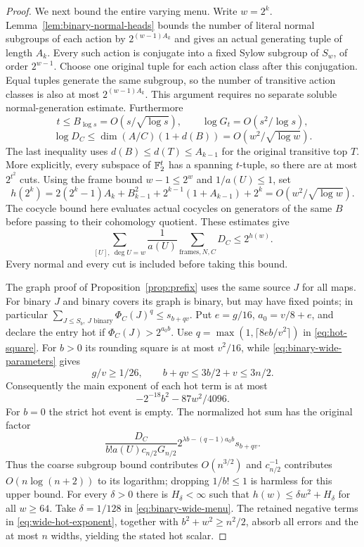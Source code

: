\begin{proof}
We next bound the entire varying menu. Write $w=2^k$.
Lemma~\ref{lem:binary-normal-heads} bounds the number of literal
normal subgroups of each action by $2^{(w-1)A_k}$ and gives an
actual generating tuple of length $A_k$. Every such action is
conjugate into a fixed Sylow subgroup of $S_w$, of order
$2^{w-1}$. Choose one original tuple for each action class after
this conjugation. Equal tuples generate the same subgroup, so
the number of transitive action classes is also at most
$2^{(w-1)A_k}$. This argument requires no separate soluble
normal-generation estimate.
Furthermore
\[
 t\leq B_{\log s}=O(s/\sqrt{\log s}),\qquad
 \log G_t=O(s^2/\log s),
\]
\[
 \log D_C\leq\dim(A/C)(1+d(B))=O(w^2/\sqrt{\log w}).
\]
The last inequality uses $d(B)\leq d(T)\leq A_{k-1}$ for the
original transitive top $T$. More explicitly, every subspace of
$\mathbb F_2^t$ has a spanning $t$-tuple, so there are at most $2^{t^2}$
cuts. Using the frame bound $w-1\leq2^w$ and $1/a(U)\leq1$, set
\[
 h(2^k)=2(2^k-1)A_k+B_{k-1}^2
          +2^{k-1}(1+A_{k-1})+2^k
       =O(w^2/\sqrt{\log w}).
\]
The cocycle bound here evaluates actual cocycles on generators
of the same $B$ before passing to their cohomology quotient.
These estimates give
\begin{equation}\label{eq:binary-wide-menu}
 \sum_{[U],\ \deg U=w}\frac1{a(U)}
        \sum_{\text{frames},N,C}D_C\leq2^{h(w)}.
\end{equation}
Every normal and every cut is included before taking this bound.

The graph proof of Proposition~\ref{prop:prefix} uses the same source
$J$ for all maps. For binary $J$ and binary covers its graph is binary,
but may have fixed points; in particular
$\sum_{J\leq S_b,\ J\text{ binary}}\Phi_C(J)^q\leq s_{b+qv}$.
Put $e=g/16$, $a_0=v/8+e$, and declare the entry hot if
$\Phi_C(J)>2^{a_0b}$. Use
$q=\max(1,\lceil8eb/v^2\rceil)$ in \eqref{eq:hot-square}.
For $b>0$ its rounding square is at most $v^2/16$, while
\eqref{eq:binary-wide-parameters} gives
\[
 g/v\geq1/26,\qquad b+qv\leq3b/2+v\leq3n/2.
\]
Consequently the main exponent of each hot term is at most
\begin{equation}\label{eq:wide-hot-exponent}
 -2^{-18}b^2-87w^2/4096.
\end{equation}
For $b=0$ the strict hot event is empty. The normalized hot sum has
the original factor
\[
 \frac{D_C}{b!a(U)c_{n/2}G_{n/2}}
       2^{\lambda b-(q-1)a_0b}s_{b+qv}.
\]
Thus the coarse subgroup bound contributes $O(n^{3/2})$ and
$c_{n/2}^{-1}$ contributes $O(n\log(n+2))$ to its logarithm;
dropping $1/b!\leq1$ is harmless for this upper bound.
For every $\delta>0$ there is $H_\delta<\infty$ such that
$h(w)\leq\delta w^2+H_\delta$ for all $w\geq64$.
Take $\delta=1/128$ in \eqref{eq:binary-wide-menu}.
The retained negative terms in \eqref{eq:wide-hot-exponent}, together
with $b^2+w^2\geq n^2/2$, absorb all errors and the at most $n$ widths,
yielding the stated hot scalar.


\end{proof}

